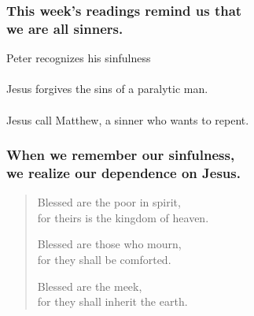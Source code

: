 \begin{frame}
\frametitle{This week's readings remind us that\\we are all sinners.}

Peter recognizes his sinfulness\\~\\
Jesus forgives the sins of a paralytic man.\\~\\
Jesus call Matthew, a sinner who wants to repent.


\end{frame}

\begin{frame}
\frametitle{When we remember our sinfulness,\\we realize  our dependence on Jesus.}
\begin{verse}
Blessed are the poor in spirit,\\for theirs is the kingdom of heaven.

Blessed are those who mourn,\\for they shall be comforted.

Blessed are the meek,\\for they shall inherit the earth.

\end{verse}
\end{frame}

\begin{frame}
\frametitle{\insertlecture}
\tableofcontents[sectionstyle=show/show]
\end{frame}

